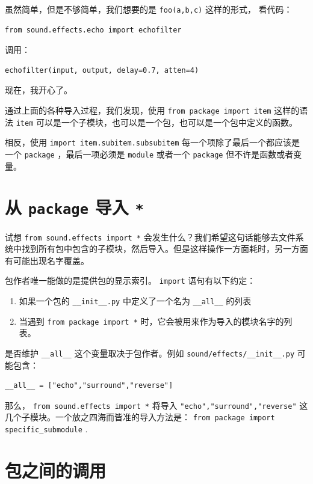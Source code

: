 \documentclass[10pt,a4paper,UTF8]{article}
\begin{document}
虽然简单，但是不够简单，我们想要的是 \texttt{foo(a,b,c)} 这样的形式， 看代码：
\begin{verbatim}
from sound.effects.echo import echofilter
\end{verbatim}

调用：
\begin{verbatim}
echofilter(input, output, delay=0.7, atten=4)
\end{verbatim}

现在，我开心了。

通过上面的各种导入过程，我们发现，使用 \texttt{from package import item} 这样的语法 \texttt{item} 可以是一个子模块，也可以是一个包，也可以是一个包中定义的函数。

相反，使用 \texttt{import item.subitem.subsubitem} 每一个项除了最后一个都应该是一个 \texttt{package} ，最后一项必须是 \texttt{module} 或者一个 \texttt{package} 但不许是函数或者变量。

\section{从 \texttt{package} 导入 \texttt{*}}
\label{sec:org3edde7a}


试想 \texttt{from sound.effects import *} 会发生什么？我们希望这句话能够去文件系统中找到所有包中包含的子模块，然后导入。但是这样操作一方面耗时，另一方面有可能出现名字覆盖。

包作者唯一能做的是提供包的显示索引。 \texttt{import} 语句有以下约定：
\begin{enumerate}
\item 如果一个包的 \texttt{\_\_init\_\_.py} 中定义了一个名为 \texttt{\_\_all\_\_} 的列表
\item 当遇到 \texttt{from package import *} 时，它会被用来作为导入的模块名字的列表。
\end{enumerate}

是否维护 \texttt{\_\_all\_\_} 这个变量取决于包作者。例如 \texttt{sound/effects/\_\_init\_\_.py} 可能包含：
\begin{verbatim}
__all__ = ["echo","surround","reverse"]
\end{verbatim}

那么， \texttt{from sound.effects import *} 将导入 \texttt{"echo","surround","reverse"} 这几个子模块。一个放之四海而皆准的导入方法是： \texttt{from package import specific\_submodule} .

\section{包之间的调用}
\label{sec:org07af38b}
\end{document}
